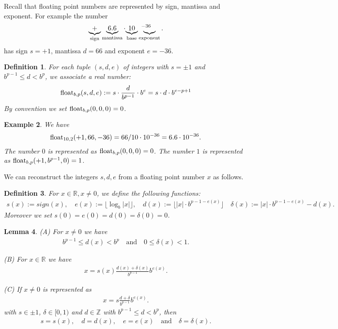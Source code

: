 \documentclass{article}
\theoremstyle{plain}
\newtheorem{definition}{Definition}[section]
\newtheorem{example}[definition]{Example}
\newtheorem{lemma}[definition]{Lemma}
\newcommand{\IR}{\mathbb{R}}
\newcommand{\IZ}{\mathbb{Z}}
\newcommand{\qtext}[1]{\quad\text{#1}\quad} %
\newcommand{\floor}[1]{\lfloor#1\rfloor}
\newcommand{\abs}[1]{|#1|}
\begin{document}
Recall that floating point numbers are represented by sign, mantissa and exponent.
For example the number
\begin{align*}
  \underbrace{+}_{\text{sign}} \underbrace{6.6}_{\text{mantissa}} \cdot {\underbrace{10}_{\text{base}}\hspace{.5em}}^{-36} \hspace{-2em}\underbrace{\hspace{.5em}}_{\text{exponent}}.
\end{align*}
has sign $s=+1$, mantissa $d=66$ and exponent $e=-36$.

\begin{definition}
  For each tuple $(s,d,e)$ of integers with $s=\pm1$ and $b^{p-1} \leq d < b^p$, we associate a real number:
  \begin{align*}
    \mathrm{float}_{b,p}(s,d,e) := s \cdot \frac{d}{b^{p-1}} \cdot b^e = s \cdot d \cdot b^{e-p+1}
  \end{align*}
  By convention we set $\mathrm{float}_{b,p}(0,0,0)=0$.
\end{definition}

\begin{example}
  We have
  \begin{align*}
    \mathrm{float}_{10,2}(+1,66,-36) = 66/10 \cdot 10^{-36}  = 6.6 \cdot 10^{-36}.
  \end{align*}
  The number $0$ is represented as $\mathrm{float}_{b,p}(0,0,0) = 0$.
  The number $1$ is represented as $\mathrm{float}_{b,p}(+1,b^{p-1},0) = 1$.
\end{example}

We can reconstruct the integers $s,d,e$ from a floating point number $x$ as follows.
\begin{definition}
  For $x\in\IR, x\neq 0$, we define the following functions:
  \begin{align*}
    s(x) := sign(x), \quad
    e(x) := \floor{\log_b\abs{x}}, \quad
    d(x) := \floor{\abs{x} \cdot b^{p-1-e(x)}} \quad
    \delta(x) := \abs{x} \cdot b^{p-1-e(x)} - d(x).
  \end{align*}
  Moreover we set $s(0) = e(0) = d(0) = \delta(0) = 0$.
\end{definition}

\begin{lemma}
  (A) For $x \neq 0$ we have
  \begin{align*}
    b^{p-1} \leq d(x) < b^p \qtext{and} 0 \leq \delta(x) < 1.
  \end{align*}

  (B) For $x \in \IR$ we have
  \begin{align*}
    x = s(x) \frac{d(x) + \delta(x)}{b^{p-1}} b^{e(x)}.
  \end{align*}

  (C) If $x \neq 0$ is represented as
  \begin{align*}
    x = s \frac{d + \delta}{b^{p-1}} b^{e(x)}.
  \end{align*}
  with $s \in {\pm 1}$, $\delta \in [0,1)$ and $d \in \IZ$ with $b^{p-1} \leq d < b^p$, then
  \begin{align*}
    s = s(x), \quad d = d(x), \quad e = e(x) \qtext{and} \delta = \delta(x).
  \end{align*}
\end{lemma}
\end{document}

